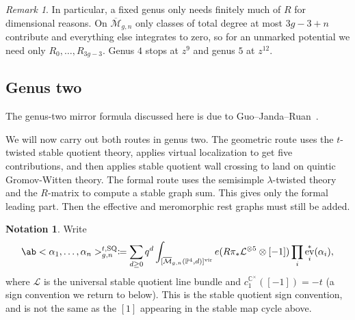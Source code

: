 \documentclass{amsart}
\theoremstyle{definition}
\newtheorem{notn}[thm]{Notation}
\theoremstyle{remark}
\newtheorem{rmk}[thm]{Remark}
\theoremstyle{plain}
\theoremstyle{definition}
\theoremstyle{remark}
\newcommand{\C}{\mathbb{C}}
\renewcommand{\P}{\mathbb{P}}
\newcommand{\Mbar}{\overline{\mathcal{M}}}
\newcommand{\mc}[1]{\mathcal{#1}}
\newcommand{\mr}[1]{\mathrm{#1}}
\newcommand{\1}{\mathbf{1}}
\newcommand{\2}{\mathbf{2}}
\newcommand{\3}{\mathbf{3}}
\newcommand{\vir}{\mr{vir}}
\DeclareMathOperator{\ev}{ev}
\begin{document}
\begin{rmk}
    In particular, a fixed genus only needs finitely much of \(R\) for dimensional reasons. On \(\Mbar_{g,n}\) only classes of total degree at most \(3g-3+n\) contribute and everything else integrates to zero, so for an unmarked potential we need only \(R_0, \ldots, R_{3g-3}\). Genus \(4\) stops at \(z^9\) and genus \(5\) at \(z^{12}\).
\end{rmk}

\subsection{Genus two}%
\label{sub:Genus two}

The genus-two mirror formula discussed here is due to Guo--Janda--Ruan~\cite{GJRgenus2}.

We will now carry out both routes in genus two. The geometric route uses the \(t\)-twisted stable quotient theory, applies virtual localization to get five contributions, and then applies stable quotient wall crossing to land on quintic Gromov-Witten theory. The formal route uses the semisimple \(\lambda\)-twisted theory and the \(R\)-matrix to compute a stable graph sum. This gives only the formal leading part. Then the effective and meromorphic rest graphs must still be added.

\begin{notn}
    Write
    \[ \ab<\alpha_1, \ldots, \alpha_n>^{t,\mr{SQ}}_{g,n} \coloneqq \sum_{d\geq0}q^d \int_{[\Mbar_{g,n}(\P^4,d)]^{\vir}}e(R\pi_*\mc{L}^{\otimes 5}\otimes[-1])\prod_i \ev_i^*(\alpha_i), \]
    where \(\mc{L}\) is the universal stable quotient line bundle and \(c_1^{\C^{\times}}([-1]) = -t\) (a sign convention we return to below). This is the stable quotient sign convention, and is not the same as the \([1]\) appearing in the stable map cycle above.
\end{notn}
\end{document}
